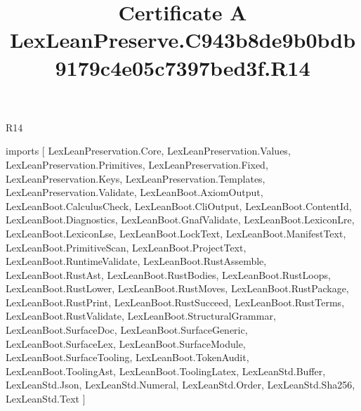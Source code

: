 \begin{lexlean}{R14}
\title{Certificate A LexLeanPreserve.C943b8de9b0bdb9179c4e05c7397bed3f.R14}
\begin{coremodule}
imports [
  LexLeanPreservation.Core,
  LexLeanPreservation.Values,
  LexLeanPreservation.Primitives,
  LexLeanPreservation.Fixed,
  LexLeanPreservation.Keys,
  LexLeanPreservation.Templates,
  LexLeanPreservation.Validate,
  LexLeanBoot.AxiomOutput,
  LexLeanBoot.CalculusCheck,
  LexLeanBoot.CliOutput,
  LexLeanBoot.ContentId,
  LexLeanBoot.Diagnostics,
  LexLeanBoot.GnafValidate,
  LexLeanBoot.LexiconLre,
  LexLeanBoot.LexiconLse,
  LexLeanBoot.LockText,
  LexLeanBoot.ManifestText,
  LexLeanBoot.PrimitiveScan,
  LexLeanBoot.ProjectText,
  LexLeanBoot.RuntimeValidate,
  LexLeanBoot.RustAssemble,
  LexLeanBoot.RustAst,
  LexLeanBoot.RustBodies,
  LexLeanBoot.RustLoops,
  LexLeanBoot.RustLower,
  LexLeanBoot.RustMoves,
  LexLeanBoot.RustPackage,
  LexLeanBoot.RustPrint,
  LexLeanBoot.RustSucceed,
  LexLeanBoot.RustTerms,
  LexLeanBoot.RustValidate,
  LexLeanBoot.StructuralGrammar,
  LexLeanBoot.SurfaceDoc,
  LexLeanBoot.SurfaceGeneric,
  LexLeanBoot.SurfaceLex,
  LexLeanBoot.SurfaceModule,
  LexLeanBoot.SurfaceTooling,
  LexLeanBoot.TokenAudit,
  LexLeanBoot.ToolingAst,
  LexLeanBoot.ToolingLatex,
  LexLeanStd.Buffer,
  LexLeanStd.Json,
  LexLeanStd.Numeral,
  LexLeanStd.Order,
  LexLeanStd.Sha256,
  LexLeanStd.Text
]


\end{coremodule}
\end{lexlean}

